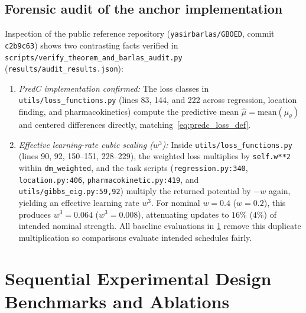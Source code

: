 \documentclass[11pt,a4paper,reqno]{amsart}
\theoremstyle{definition}
\theoremstyle{remark}
\begin{document}
\subsection{Forensic audit of the anchor implementation}\label{sec:barlas_audit}
Inspection of the public reference repository (\nolinkurl{yasirbarlas/GBOED}, commit \texttt{c2b9c63}) shows two contrasting facts verified in \nolinkurl{scripts/verify_theorem_and_barlas_audit.py} (\nolinkurl{results/audit_results.json}):
\begin{enumerate}[label=(\arabic*)]
\item \emph{PredC implementation confirmed:} The loss classes in \nolinkurl{utils/loss_functions.py} (lines 83, 144, and 222 across regression, location finding, and pharmacokinetics) compute the predictive mean $\hat{\mu} = \mathrm{mean}(\mu_\theta)$ and centered differences directly, matching~\eqref{eq:predc_loss_def}.
\item \emph{Effective learning-rate cubic scaling ($w^3$):} Inside \nolinkurl{utils/loss_functions.py} (lines 90, 92, 150--151, 228--229), the weighted loss multiplies by \nolinkurl{self.w**2} within \nolinkurl{dm_weighted}, and the task scripts (\nolinkurl{regression.py:340}, \nolinkurl{location.py:406}, \nolinkurl{pharmacokinetic.py:419}, and \nolinkurl{utils/gibbs_eig.py:59,92}) multiply the returned potential by $-w$ again, yielding an effective learning rate $w^3$. For nominal $w = 0.4$ ($w = 0.2$), this produces $w^3 = 0.064$ ($w^3 = 0.008$), attenuating updates to $16\%$ ($4\%$) of intended nominal strength. All baseline evaluations in \cref{sec:benchmarks} remove this duplicate multiplication so comparisons evaluate intended schedules fairly.
\end{enumerate}

\section{Sequential Experimental Design Benchmarks and Ablations}\label{sec:benchmarks}
\end{document}
